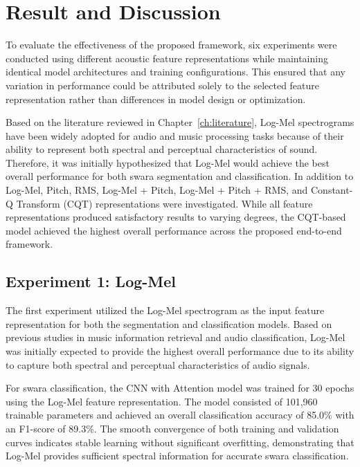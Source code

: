 \chapter{Result and Discussion}
\label{ch:results}

To evaluate the effectiveness of the proposed framework, six experiments were conducted using different acoustic feature representations while maintaining identical model architectures and training configurations. This ensured that any variation in performance could be attributed solely to the selected feature representation rather than differences in model design or optimization.

Based on the literature reviewed in Chapter~\ref{ch:literature}, Log-Mel spectrograms have been widely adopted for audio and music processing tasks because of their ability to represent both spectral and perceptual characteristics of sound. Therefore, it was initially hypothesized that Log-Mel would achieve the best overall performance for both swara segmentation and classification. In addition to Log-Mel, Pitch, RMS, Log-Mel + Pitch, Log-Mel + Pitch + RMS, and Constant-Q Transform (CQT) representations were investigated. While all feature representations produced satisfactory results to varying degrees, the CQT-based model achieved the highest overall performance across the proposed end-to-end framework.

\section{Experiment 1: Log-Mel}

The first experiment utilized the Log-Mel spectrogram as the input feature representation for both the segmentation and classification models. Based on previous studies in music information retrieval and audio classification, Log-Mel was initially expected to provide the highest overall performance due to its ability to capture both spectral and perceptual characteristics of audio signals.

For swara classification, the CNN with Attention model was trained for 30 epochs using the Log-Mel feature representation. The model consisted of 101,960 trainable parameters and achieved an overall classification accuracy of 85.0\% with an F1-score of 89.3\%. The smooth convergence of both training and validation curves indicates stable learning without significant overfitting, demonstrating that Log-Mel provides sufficient spectral information for accurate swara classification.

